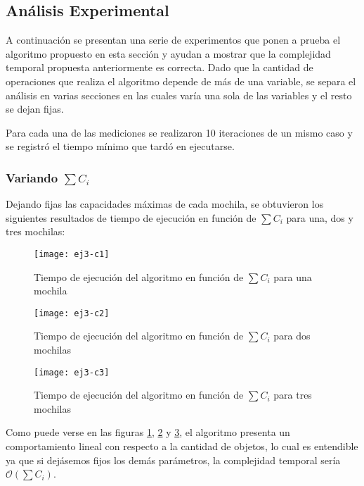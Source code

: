 \subsection{Análisis Experimental}

A continuación se presentan una serie de experimentos que ponen a prueba el algoritmo propuesto en esta sección y ayudan a mostrar que la complejidad temporal propuesta anteriormente es correcta.
Dado que la cantidad de operaciones que realiza el algoritmo depende de más de una variable, se separa el análisis en varias secciones en las cuales varía una sola de las variables y el resto se dejan fijas.

Para cada una de las mediciones se realizaron 10 iteraciones de un mismo caso y se registró el tiempo mínimo que tardó en ejecutarse.

\subsubsection{Variando $\sum C_i$}

Dejando fijas las capacidades máximas de cada mochila, se obtuvieron los siguientes resultados de tiempo de ejecución en función de $\sum C_i$ para una, dos y tres mochilas:

\begin{figure}[H]
		\centering
		\texttt{[image: ej3-c1]}
		\caption{Tiempo de ejecución del algoritmo en función de $\sum C_i$ para una mochila}
		\label{fig:ej3-c1-fig}
	\end{figure}

\begin{figure}[H]
		\centering
		\texttt{[image: ej3-c2]}
		\caption{Tiempo de ejecución del algoritmo en función de $\sum C_i$ para dos mochilas}
		\label{fig:ej3-c2-fig}
	\end{figure}

\begin{figure}[H]
		\centering
		\texttt{[image: ej3-c3]}
		\caption{Tiempo de ejecución del algoritmo en función de $\sum C_i$ para tres mochilas}
		\label{fig:ej3-c3-fig}
	\end{figure}

Como puede verse en las figuras \ref{fig:ej3-c1-fig}, \ref{fig:ej3-c2-fig} y \ref{fig:ej3-c3-fig}, el algoritmo presenta un comportamiento lineal con respecto a la cantidad de objetos, lo cual es entendible ya que si dejásemos fijos los demás parámetros, la complejidad temporal sería $\mathcal{O}(\sum C_i)$. %


